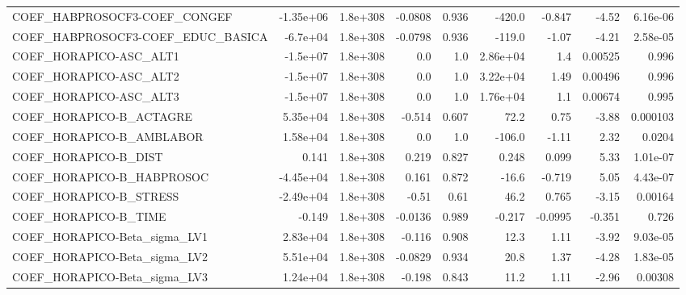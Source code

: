 \begin{tabular}{lrrrrrrrr}
COEF\_HABPROSOCF3-COEF\_CONGEF      &   -1.35e+06 &     1.8e+308 & -0.0808 &    0.936 &     -420.0 &      -0.847 &        -4.52 &      6.16e-06 \\
COEF\_HABPROSOCF3-COEF\_EDUC\_BASICA &    -6.7e+04 &     1.8e+308 & -0.0798 &    0.936 &     -119.0 &       -1.07 &        -4.21 &      2.58e-05 \\
COEF\_HORAPICO-ASC\_ALT1            &    -1.5e+07 &     1.8e+308 &     0.0 &      1.0 &   2.86e+04 &         1.4 &      0.00525 &         0.996 \\
COEF\_HORAPICO-ASC\_ALT2            &    -1.5e+07 &     1.8e+308 &     0.0 &      1.0 &   3.22e+04 &        1.49 &      0.00496 &         0.996 \\
COEF\_HORAPICO-ASC\_ALT3            &    -1.5e+07 &     1.8e+308 &     0.0 &      1.0 &   1.76e+04 &         1.1 &      0.00674 &         0.995 \\
COEF\_HORAPICO-B\_ACTAGRE           &    5.35e+04 &     1.8e+308 &  -0.514 &    0.607 &       72.2 &        0.75 &        -3.88 &      0.000103 \\
COEF\_HORAPICO-B\_AMBLABOR          &    1.58e+04 &     1.8e+308 &     0.0 &      1.0 &     -106.0 &       -1.11 &         2.32 &        0.0204 \\
COEF\_HORAPICO-B\_DIST              &       0.141 &     1.8e+308 &   0.219 &    0.827 &      0.248 &       0.099 &         5.33 &      1.01e-07 \\
COEF\_HORAPICO-B\_HABPROSOC         &   -4.45e+04 &     1.8e+308 &   0.161 &    0.872 &      -16.6 &      -0.719 &         5.05 &      4.43e-07 \\
COEF\_HORAPICO-B\_STRESS            &   -2.49e+04 &     1.8e+308 &   -0.51 &     0.61 &       46.2 &       0.765 &        -3.15 &       0.00164 \\
COEF\_HORAPICO-B\_TIME              &      -0.149 &     1.8e+308 & -0.0136 &    0.989 &     -0.217 &     -0.0995 &       -0.351 &         0.726 \\
COEF\_HORAPICO-Beta\_sigma\_LV1      &    2.83e+04 &     1.8e+308 &  -0.116 &    0.908 &       12.3 &        1.11 &        -3.92 &      9.03e-05 \\
COEF\_HORAPICO-Beta\_sigma\_LV2      &    5.51e+04 &     1.8e+308 & -0.0829 &    0.934 &       20.8 &        1.37 &        -4.28 &      1.83e-05 \\
COEF\_HORAPICO-Beta\_sigma\_LV3      &    1.24e+04 &     1.8e+308 &  -0.198 &    0.843 &       11.2 &        1.11 &        -2.96 &       0.00308 \\

\end{tabular}
